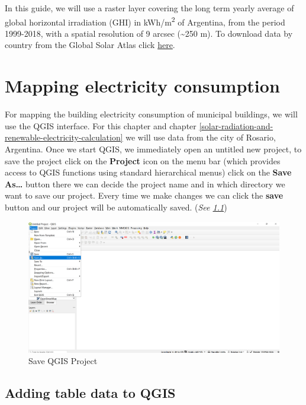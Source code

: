 \documentclass[
]{book}
\begin{document}
In this guide, we will use a raster layer covering the long term yearly average of global horizontal irradiation (GHI) in kWh/m\textsuperscript{2} of Argentina, from the period 1999-2018, with a spatial resolution of 9 arcsec (\textasciitilde250 m). To download data by country from the Global Solar Atlas click \href{http://https://globalsolaratlas.info/download/}{here}.

\hypertarget{mapping-electricity-consumption}{%
\chapter{Mapping electricity consumption}\label{mapping-electricity-consumption}}

For mapping the building electricity consumption of municipal buildings, we will use the QGIS interface. For this chapter and chapter \ref{solar-radiation-and-renewable-electricity-calculation} we will use data from the city of Rosario, Argentina.
Once we start QGIS, we immediately open an untitled new project, to save the project click on the \textbf{Project} icon on the menu bar (which provides access to QGIS functions using standard hierarchical menus) click on the \textbf{Save As\ldots{}} button there we can decide the project name and in which directory we want to save our project. Every time we make changes we can click the \textbf{save} button and our project will be automatically saved. (\emph{See \ref{fig:img-33335}})

\begin{figure}

{\centering \includegraphics[width=1\linewidth]{images/saveas} 

}

\caption{Save QGIS Project}\label{fig:img-33335}
\end{figure}

\hypertarget{adding-table-data-to-qgis}{%
\section{Adding table data to QGIS}\label{adding-table-data-to-qgis}}
\end{document}
